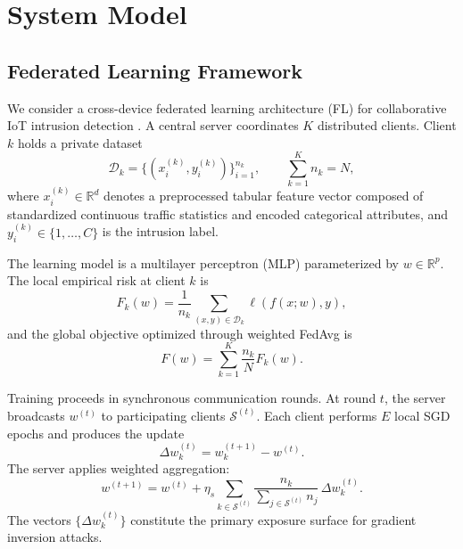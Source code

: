 \documentclass[journal,twoside,web]{ieeecolor}
\begin{document}




\section{System Model}
\label{sec:system}

\subsection{Federated Learning Framework}

We consider a cross-device federated learning architecture (FL) for collaborative IoT intrusion detection \cite{mcmahan2017fedavg}. 
A central server coordinates $K$ distributed clients. Client $k$ holds a private dataset
\[
\mathcal{D}_k = \{(x_i^{(k)}, y_i^{(k)})\}_{i=1}^{n_k},
\qquad
\sum_{k=1}^{K} n_k = N,
\]
where $x_i^{(k)} \in \mathbb{R}^d$ denotes a preprocessed tabular feature vector composed of standardized continuous traffic statistics and encoded categorical attributes, and $y_i^{(k)} \in \{1,\dots,C\}$ is the intrusion label.

The learning model is a multilayer perceptron (MLP) parameterized by $w \in \mathbb{R}^p$. 
The local empirical risk at client $k$ is
\begin{equation}
F_k(w)
=
\frac{1}{n_k}
\sum_{(x,y)\in\mathcal{D}_k}
\ell(f(x;w),y),
\end{equation}
and the global objective optimized through weighted FedAvg is
\begin{equation}
F(w)
=
\sum_{k=1}^{K}
\frac{n_k}{N}
F_k(w).
\end{equation}

Training proceeds in synchronous communication rounds. At round $t$, the server broadcasts $w^{(t)}$ to participating clients $\mathcal{S}^{(t)}$. 
Each client performs $E$ local SGD epochs and produces the update
\begin{equation}
\Delta w_k^{(t)} = w_k^{(t+1)} - w^{(t)}.
\end{equation}
The server applies weighted aggregation:
\begin{equation}
w^{(t+1)}
=
w^{(t)}
+
\eta_s
\sum_{k \in \mathcal{S}^{(t)}}
\frac{n_k}{\sum_{j \in \mathcal{S}^{(t)}} n_j}
\,
\Delta w_k^{(t)}.
\end{equation}
The vectors $\{\Delta w_k^{(t)}\}$ constitute the primary exposure surface for gradient inversion attacks.
\end{document}
